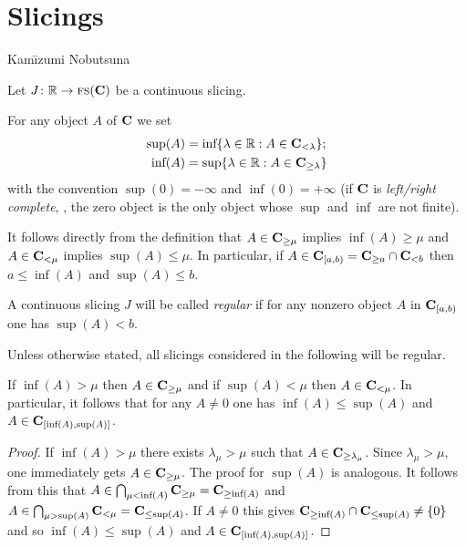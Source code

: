 \section{Slicings}\label{slici}
\epigraph{}{Kam\={\i}zumi Nobutsuna}
Let $J\colon \mathbb{R}\to \text{\scshape fs}(\mathbf{C})$ be a continuous slicing.
\begin{definition}\label{sup.n.inf}
For any object $A$ of $\mathbf{C}$ we set
\begin{align*}
\text{sup}(A) &=\text{inf}\{\lambda\in \mathbb{R}: A\in \mathbf{C}_{<\lambda}\};\\
\text{inf}(A) &=\text{sup}\{\lambda\in \mathbb{R}: A\in \mathbf{C}_{\geq\lambda}\}
\end{align*}
with the convention $\sup(0)=-\infty$ and $\inf(0) = +\infty$ (if $\mathbf{C}$ is \emph{left\fshyp{}right complete}, \cite[ \textbf{1.2.1.19}]{LurieHA}, the zero object is the only object whose $\sup$ and $\inf$ are not finite).
\end{definition}
\begin{remark}\label{rem.bounds}
It follows directly from the definition that $A\in \mathbf{C}_{\geq \mu}$ implies $\inf(A)\geq \mu$ and $A\in \mathbf{C}_{<\mu}$ implies $\sup(A)\leq \mu$. In particular, if $A\in \mathbf{C}_{[a,b)} = \mathbf{C}_{\ge a}\cap \mathbf{C}_{<b}$ then $a\leq\inf(A)$ and $\sup(A) \leq b$.
\end{remark}
\begin{definition}
A continuous slicing $J$ will be called \emph{regular} if for any nonzero object $A$ in $\mathbf{C}_{[a,b)}$ one has $\sup(A)<b$.
\end{definition}
Unless otherwise stated, all slicings considered in the following will be regular.
\begin{lemma}\label{lemma.maggiore.minore}
If $\inf(A)> \mu$ then $A\in \mathbf{C}_{\geq \mu}$ and if $\sup(A)<\mu$ then $A\in \mathbf{C}_{<\mu}$. In particular, it follows that for any $A\neq 0$ one has $\inf(A)\leq \sup(A)$ and $A\in \mathbf{C}_{[\text{inf}(A),\text{sup}(A)]}$.
\end{lemma}
\begin{proof}
If $\inf(A)> \mu$ there exists $\lambda_\mu>\mu$ such that $A\in\mathbf{C}_{\geq \lambda_\mu}$. Since $\lambda_\mu>\mu$, one immediately gets $A\in\mathbf{C}_{\geq \mu}$. The proof for $\sup(A)$ is analogous. It follows from this that $A\in \bigcap_{\mu<\text{inf}(A)}\mathbf{C}_{\geq \mu}=\mathbf{C}_{\geq \text{inf}(A)}$ and $A\in \bigcap_{\mu>\text{sup}(A)}\mathbf{C}_{<\mu}=\mathbf{C}_{\leq \text{sup}(A)}$. If $A\neq 0$ this gives $\mathbf{C}_{\geq \text{inf}(A)}\cap \mathbf{C}_{\leq \text{sup}(A)}\neq \{0\}$ and so $\inf(A)\leq \sup(A)$ and $A\in\mathbf{C}_{[\text{inf}(A),\text{sup}(A)]}$. 
\end{proof}
